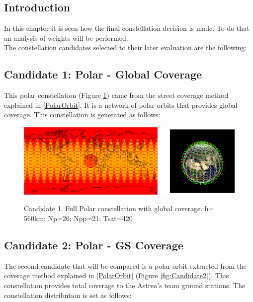 \subsection{Introduction} 
In this chapter it is seen how the final constellation decision is made. To do that an analysis of weights will be performed.\\

The constellation candidates selected to their later evaluation are the following:

\subsection{Candidate 1: Polar - Global Coverage}

This polar constellation (Figure \ref{fig:Candidate1}) came from the street coverage method explained in \ref{PolarOrbit}. It is a network of polar orbits that provides global coverage. This constellation is generated as follows:

\begin{figure}%
	\centering
	\includegraphics[width=1\textwidth]{Candidate1.png}\\
	\caption{Candidate 1. Full Polar constellation with global coverage.
			 h= 560km; Np=20; Npp=21; Tsat=420 }
	\label{fig:Candidate1}
\end{figure}


\subsection{Candidate 2: Polar - GS Coverage}
 
The second candidate that will be compared is a polar orbit extracted from the coverage method explained in \ref{PolarOrbit} (Figure \ref{fig:Candidate2}). This constellation provides total coverage to the Astrea's team ground stations. The constellation distribution is set as follows:


